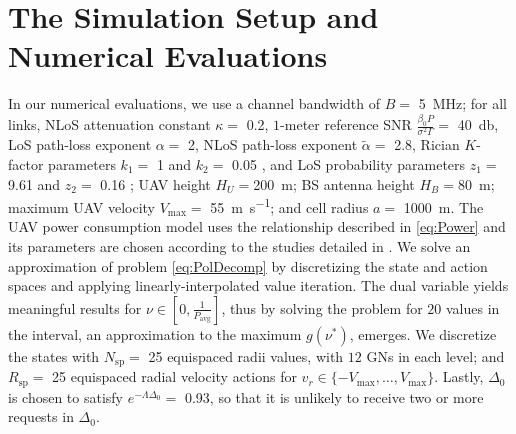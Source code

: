 \documentclass[12pt, draftcls, onecolumn]{IEEEtran}
\theoremstyle{plain}
\theoremstyle{definition}
\theoremstyle{remark}
\begin{document}
\section{The Simulation Setup and Numerical Evaluations}\label{S6}
\vspace{-2mm}

In our numerical evaluations, we use a channel bandwidth of $B=$ \qty[mode=text]{5}{\mega\hertz}; for all links, NLoS attenuation constant $\kappa=$ \qty[mode=text]{0.2}{}, $1$-meter reference SNR $\frac{\beta_{0}P}{\sigma^{2}\Gamma}=$ \qty[mode=text]{40}{\decibel}, LoS path-loss exponent $\alpha=$ \qty[mode=text]{2}{}, NLoS path-loss exponent $\tilde{\alpha}=$ \qty[mode=text]{2.8}{}, Rician $K$-factor parameters $k_{1}=$ \qty[mode=text]{1}{} and $k_{2}=$ \qty[mode=text]{0.05}{} \cite{Rician}, and LoS probability parameters $z_{1}=$ \qty[mode=text]{9.61}{} and $z_{2}=$ \qty[mode=text]{0.16}{} \cite{OptimalAltitude}; UAV height $H_{U}=$\qty[mode=text]{200}{\meter}; BS antenna height $H_{B}=$\qty[mode=text]{80}{\meter}; maximum UAV velocity $V_{\mathrm{max}}=$ \qty[mode=text]{55}{\meter\per\second}; and cell radius $a=$ \qty[mode=text]{1000}{\meter}. The UAV power consumption model uses the relationship described in \eqref{eq:Power} and its parameters are chosen according to the studies detailed in \cite{SCA}. We solve an approximation of problem \eqref{eq:PolDecomp} by discretizing the state and action spaces and applying linearly-interpolated value iteration. The dual variable yields meaningful results for $\nu{\in}[0,\frac{1}{P_{\mathrm{avg}}}]$, thus by solving the problem for $20$ values in the interval, an approximation to the maximum $g(\nu^*)$, emerges. We discretize the states with $N_{\mathrm{sp}}=$ \qty[mode=text]{25}{} equispaced radii values, with $12$ GNs in each level; and $R_{\mathrm{sp}}=$ \qty[mode=text]{25}{} equispaced radial velocity actions for $v_r{\in}\{-V_{\mathrm{max}},{\dots},V_{\mathrm{max}}\}$. Lastly, $\Delta_{0}$ is chosen to satisfy $e^{-\Lambda\Delta_{0}}{=}$ \qty[mode=text]{0.93}{}, so that it is unlikely to receive two or more requests in $\Delta_{0}$.
\end{document}
